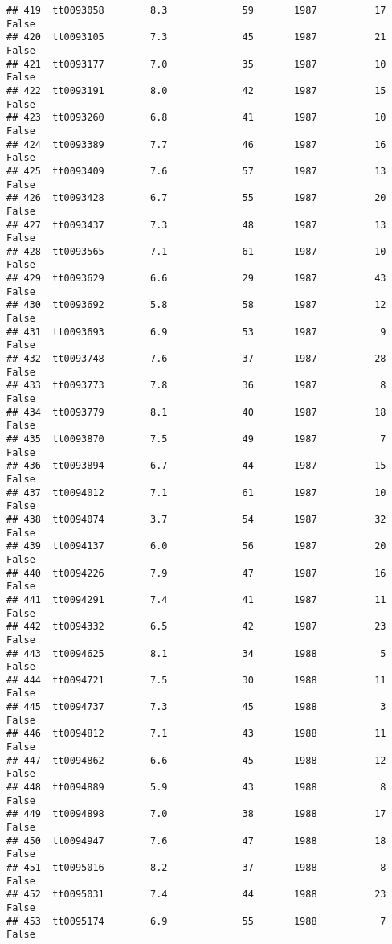\documentclass[
]{article}
\begin{document}
\begin{verbatim}
## 419  tt0093058        8.3             59       1987          17   False
## 420  tt0093105        7.3             45       1987          21   False
## 421  tt0093177        7.0             35       1987          10   False
## 422  tt0093191        8.0             42       1987          15   False
## 423  tt0093260        6.8             41       1987          10   False
## 424  tt0093389        7.7             46       1987          16   False
## 425  tt0093409        7.6             57       1987          13   False
## 426  tt0093428        6.7             55       1987          20   False
## 427  tt0093437        7.3             48       1987          13   False
## 428  tt0093565        7.1             61       1987          10   False
## 429  tt0093629        6.6             29       1987          43   False
## 430  tt0093692        5.8             58       1987          12   False
## 431  tt0093693        6.9             53       1987           9   False
## 432  tt0093748        7.6             37       1987          28   False
## 433  tt0093773        7.8             36       1987           8   False
## 434  tt0093779        8.1             40       1987          18   False
## 435  tt0093870        7.5             49       1987           7   False
## 436  tt0093894        6.7             44       1987          15   False
## 437  tt0094012        7.1             61       1987          10   False
## 438  tt0094074        3.7             54       1987          32   False
## 439  tt0094137        6.0             56       1987          20   False
## 440  tt0094226        7.9             47       1987          16   False
## 441  tt0094291        7.4             41       1987          11   False
## 442  tt0094332        6.5             42       1987          23   False
## 443  tt0094625        8.1             34       1988           5   False
## 444  tt0094721        7.5             30       1988          11   False
## 445  tt0094737        7.3             45       1988           3   False
## 446  tt0094812        7.1             43       1988          11   False
## 447  tt0094862        6.6             45       1988          12   False
## 448  tt0094889        5.9             43       1988           8   False
## 449  tt0094898        7.0             38       1988          17   False
## 450  tt0094947        7.6             47       1988          18   False
## 451  tt0095016        8.2             37       1988           8   False
## 452  tt0095031        7.4             44       1988          23   False
## 453  tt0095174        6.9             55       1988           7   False

\end{verbatim}
\end{document}
